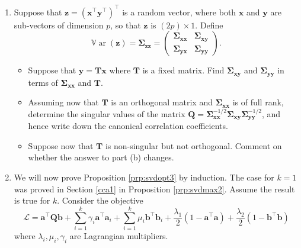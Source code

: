 \documentclass[]{book}
\providecommand{\tightlist}{%
  \setlength{\itemsep}{0pt}\setlength{\parskip}{0pt}}
\theoremstyle{definition}
\theoremstyle{definition}
\theoremstyle{definition}
\theoremstyle{remark}
\begin{document}
\begin{enumerate}
\def\labelenumi{\arabic{enumi}.}
\tightlist
\item
  Suppose that \(\boldsymbol z= (\boldsymbol x^\top \boldsymbol y^\top)^\top\) is a random vector, where both \(\boldsymbol x\) and \(\boldsymbol y\) are sub-vectors of dimension \(p\), so that \(\boldsymbol z\) is \((2p)\times 1\). Define
  \[{\mathbb{V}\operatorname{ar}}(\boldsymbol z)=\boldsymbol \Sigma_{\boldsymbol z\boldsymbol z}=\begin{pmatrix} \boldsymbol \Sigma_{\boldsymbol x\boldsymbol x} & \boldsymbol \Sigma_{\boldsymbol x\boldsymbol y}\\\boldsymbol \Sigma_{\boldsymbol y\boldsymbol x} & \boldsymbol \Sigma_{\boldsymbol y\boldsymbol y}  \end{pmatrix}.\]

  \begin{itemize}
  \tightlist
  \item
    Suppose that \(\boldsymbol y= \boldsymbol T\boldsymbol x\) where \(\boldsymbol T\) is a fixed matrix. Find \(\boldsymbol \Sigma_{\boldsymbol x\boldsymbol y}\) and \(\boldsymbol \Sigma_{\boldsymbol y\boldsymbol y}\) in terms of \(\boldsymbol \Sigma_{\boldsymbol x\boldsymbol x}\) and \(\boldsymbol T\).
  \item
    Assuming now that \(\boldsymbol T\) is an orthogonal matrix and \(\boldsymbol \Sigma_{\boldsymbol x\boldsymbol x}\) is of full rank, determine the singular values of the matrix \(\boldsymbol Q=\boldsymbol \Sigma_{\boldsymbol x\boldsymbol x}^{-1/2}\boldsymbol \Sigma_ {\boldsymbol x\boldsymbol y}\boldsymbol \Sigma_{\boldsymbol y\boldsymbol y}^{-1/2}\), and hence write down the canonical correlation coefficients.
  \item
    Suppose now that \(\boldsymbol T\) is non-singular but not orthogonal. Comment on whether the answer to part (b) changes.
  \end{itemize}
\item
  We will now prove Proposition \ref{prp:svdopt3} by induction.
  The case for \(k=1\) was proved in Section \ref{cca1} in Proposition \ref{prp:svdmax2}. Assume the result is true for \(k\). Consider the objective
  \[\mathcal{L} = \boldsymbol a^\top \boldsymbol Q\boldsymbol b+ \sum_{i=1}^k \gamma_i\boldsymbol a^\top \boldsymbol a_i + \sum_{i=1}^k \mu_i\boldsymbol b^\top \boldsymbol b_i + \frac{\lambda_1}{2}(1-\boldsymbol a^\top\boldsymbol a)+ \frac{\lambda_2}{2}(1-\boldsymbol b^\top\boldsymbol b)\]
  where \(\lambda_i, \mu_i, \gamma_i\) are Lagrangian multipliers.


\end{enumerate}
\end{document}
